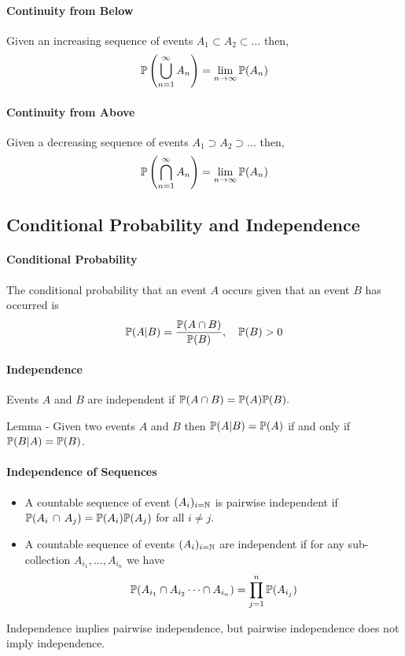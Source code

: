 \paragraph {Continuity from Below}
Given an increasing sequence of events \(A_1 \subset A_2 \subset \dots\) then, 
\[
    \mathbb{P}\left(
        \bigcup_{n=1}^{\infty} A_n
    \right)
    =
    \lim_{n\to\infty} \mathbb{P} (A_n)
\]

\paragraph {Continuity from Above}
Given a decreasing sequence of events \(A_1 \supset A_2 \supset \dots\) then, 
\[
    \mathbb{P}\left(
        \bigcap_{n=1}^{\infty} A_n
    \right)
    =
    \lim_{n\to\infty} \mathbb{P} (A_n)
\]

\subsection{Conditional Probability and Independence}
\paragraph{Conditional Probability}
The conditional probability that an event \(A\) occurs given that an event \(B\) has occurred is 
\[\mathbb{P}(A|B) = \frac{\mathbb{P}(A\cap B)}{\mathbb{P}(B)}, \quad \mathbb{P}(B) > 0\]

\paragraph{Independence}
Events \(A\) and \(B\) are independent if \(\mathbb{P}(A \cap B) = \mathbb{P}(A)\mathbb{P}(B).\)

Lemma - Given two events \(A\) and \(B\) then \(\mathbb{P}(A|B) = \mathbb{P}(A)\) if and only if \(\mathbb{P}(B|A) = \mathbb{P}(B)\).

\paragraph{Independence of Sequences}
\begin{itemize}
    \item A countable sequence of event \((A_i)_{i=\mathbb{N}}\) is pairwise independent if \(\mathbb{P}(A_i \, \cap \, A_j) = \mathbb{P}(A_i)\mathbb{P}(A_j)\) for all \(i \neq j\).
    \item A countable sequence of events \((A_i)_{i=\mathbb{N}}\) are independent if for any sub-collection \(A_{i_1}, \dots, A_{i_n}\) we have 
    \[\mathbb{P}(A_{i_1} \cap A_{i_2} \cdots \cap A_{i_n}) = \prod_{j=1}^n \mathbb{P}(A_{i_j})\]
\end{itemize}
Independence implies pairwise independence, but pairwise independence does not imply independence. 

